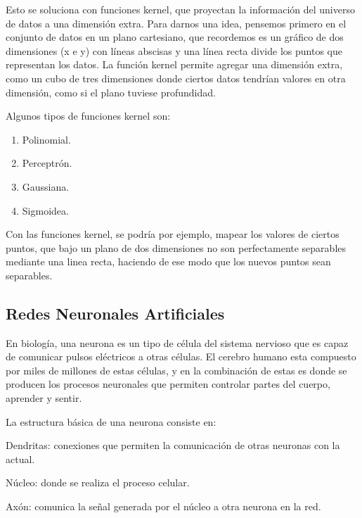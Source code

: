 \documentclass[a4paper,12pt,oneside,spanish]{book}
\begin{document}
Esto se soluciona con funciones kernel, que proyectan la información del universo de datos a una dimensión extra. Para darnos una idea, pensemos primero en el conjunto de datos en un plano cartesiano, que recordemos es un gráfico de dos dimensiones (x e y) con líneas abscisas y una línea recta divide los puntos que representan los datos. La función kernel permite agregar una dimensión extra, como un cubo de tres dimensiones donde ciertos datos tendrían valores en otra dimensión, como si el plano tuviese profundidad. \par

Algunos tipos de funciones kernel son: \par

\begin{enumerate}
	\baselineskip 16pt
	\item Polinomial.
	\item Perceptrón.
	\item Gaussiana.
	\item Sigmoidea.
\end{enumerate}\baselineskip 16pt

Con las funciones kernel, se podría por ejemplo, mapear los valores de ciertos puntos, que bajo un plano de dos dimensiones no son perfectamente separables mediante una linea recta, haciendo de ese modo que los nuevos puntos sean separables.

\subsection{Redes Neuronales Artificiales}

En biología, una neurona es un tipo de célula del sistema nervioso que es capaz de comunicar pulsos eléctricos a otras células. El cerebro humano esta compuesto por miles de millones de estas células, y en la combinación de estas es donde se producen los procesos neuronales que permiten controlar partes del cuerpo, aprender y sentir. \par

La estructura básica de una neurona consiste en:
\begin{compactitem}
	\item Dendritas: conexiones que permiten la comunicación de otras neuronas con la actual.
	\item Núcleo: donde se realiza el proceso celular.
	\item Axón: comunica la señal generada por el núcleo a otra neurona en la red.
\end{compactitem}
\end{document}
